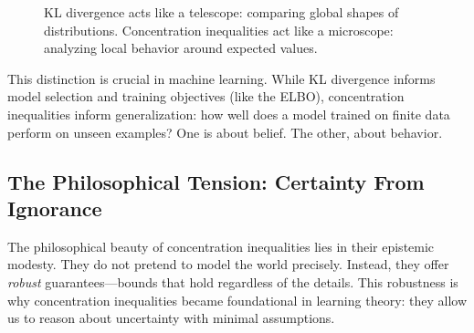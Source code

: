 \begin{figure}[H]
    \centering
    \caption{KL divergence acts like a telescope: comparing global shapes of distributions. Concentration inequalities act like a microscope: analyzing local behavior around expected values.}
    \label{fig:telescope_vs_microscope}
\end{figure}



This distinction is crucial in machine learning. While KL divergence informs model selection and training objectives (like the ELBO), concentration inequalities inform generalization: how well does a model trained on finite data perform on unseen examples? One is about belief. The other, about behavior.

\subsection{The Philosophical Tension: Certainty From Ignorance}

The philosophical beauty of concentration inequalities lies in their epistemic modesty. They do not pretend to model the world precisely. Instead, they offer \emph{robust} guarantees—bounds that hold regardless of the details. This robustness is why concentration inequalities became foundational in learning theory: they allow us to reason about uncertainty with minimal assumptions.

